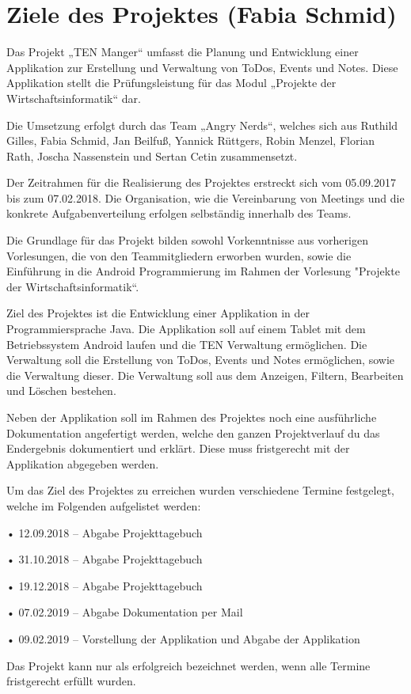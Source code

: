\section{Ziele des Projektes (Fabia Schmid)}

Das Projekt „TEN Manger“ umfasst die Planung und Entwicklung einer Applikation zur Erstellung und Verwaltung von ToDos, Events und Notes. Diese Applikation stellt die Prüfungsleistung für das Modul „Projekte der Wirtschaftsinformatik“ dar.

Die Umsetzung erfolgt durch das Team „Angry Nerds“, welches sich aus Ruthild Gilles, Fabia Schmid, Jan Beilfuß, Yannick Rüttgers, Robin Menzel, Florian Rath, Joscha Nassenstein und Sertan Cetin zusammensetzt.

Der Zeitrahmen für die Realisierung des Projektes erstreckt sich vom 05.09.2017 bis zum 07.02.2018. Die Organisation, wie die Vereinbarung von Meetings und die konkrete Aufgabenverteilung erfolgen selbständig innerhalb des Teams.

Die Grundlage für das Projekt bilden sowohl Vorkenntnisse aus vorherigen Vorlesungen, die von den Teammitgliedern erworben wurden, sowie die Einführung in die Android Programmierung im Rahmen der Vorlesung "Projekte der Wirtschaftsinformatik“.

Ziel des Projektes ist die Entwicklung einer Applikation in der Programmiersprache Java. Die Applikation soll auf einem Tablet mit dem Betriebssystem Android laufen und die TEN Verwaltung ermöglichen. Die Verwaltung soll die Erstellung von ToDos, Events und Notes ermöglichen, sowie die Verwaltung dieser. Die Verwaltung soll aus dem Anzeigen, Filtern, Bearbeiten und Löschen bestehen.

Neben der Applikation soll im Rahmen des Projektes noch eine ausführliche Dokumentation angefertigt werden, welche den ganzen Projektverlauf du das Endergebnis dokumentiert und erklärt. Diese muss fristgerecht mit der Applikation abgegeben werden.

\newpage

Um das Ziel des Projektes zu erreichen wurden verschiedene Termine festgelegt, welche im Folgenden aufgelistet werden:

•	12.09.2018 – Abgabe Projekttagebuch

•	31.10.2018 – Abgabe Projekttagebuch

•	19.12.2018 – Abgabe Projekttagebuch

•	07.02.2019 – Abgabe Dokumentation per Mail

•	09.02.2019 – Vorstellung der Applikation und Abgabe der Applikation

Das Projekt kann nur als erfolgreich bezeichnet werden, wenn alle Termine fristgerecht erfüllt wurden.


